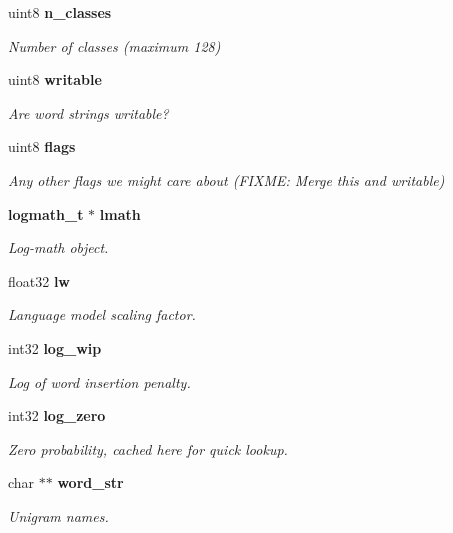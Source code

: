 \begin{DoxyCompactItemize}
uint8 \textbf{ n\+\_\+classes}
\begin{DoxyCompactList}\small\item\em Number of classes (maximum 128) \end{DoxyCompactList}\item 
\mbox{\label{structngram__model__s_a78a3253febced2cae4732044da466ee6}} 
uint8 \textbf{ writable}
\begin{DoxyCompactList}\small\item\em Are word strings writable? \end{DoxyCompactList}\item 
\mbox{\label{structngram__model__s_ac609a2f867496d6ca719351d566db328}} 
uint8 \textbf{ flags}
\begin{DoxyCompactList}\small\item\em Any other flags we might care about (F\+I\+X\+ME\+: Merge this and writable) \end{DoxyCompactList}\item 
\mbox{\label{structngram__model__s_a2ca373109c651ac998b33153eb38fd95}} 
\textbf{ logmath\+\_\+t} $\ast$ \textbf{ lmath}
\begin{DoxyCompactList}\small\item\em Log-\/math object. \end{DoxyCompactList}\item 
\mbox{\label{structngram__model__s_a76ea0c65b23de80091e7c602bdb43bde}} 
float32 \textbf{ lw}
\begin{DoxyCompactList}\small\item\em Language model scaling factor. \end{DoxyCompactList}\item 
\mbox{\label{structngram__model__s_a3d6bf5632760a16e52cb881d7010d774}} 
int32 \textbf{ log\+\_\+wip}
\begin{DoxyCompactList}\small\item\em Log of word insertion penalty. \end{DoxyCompactList}\item 
\mbox{\label{structngram__model__s_a65425a599c4bcc4dda809d81149b8fc0}} 
int32 \textbf{ log\+\_\+zero}
\begin{DoxyCompactList}\small\item\em Zero probability, cached here for quick lookup. \end{DoxyCompactList}\item 
\mbox{\label{structngram__model__s_ae625e779e340845f03fb3da164e93039}} 
char $\ast$$\ast$ \textbf{ word\+\_\+str}
\begin{DoxyCompactList}\small\item\em Unigram names. \end{DoxyCompactList}\item 
$$
\end{DoxyCompactItemize}
